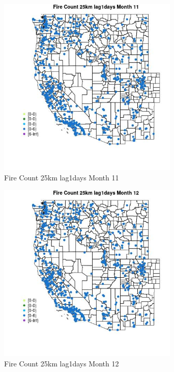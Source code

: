 \begin{figure} 
\centering  
\includegraphics[width=0.77\textwidth]{Code_Outputs/Report_ML_input_PM25_Step4_part_e_de_duplicated_aves_compiled_2019-05-21wNAs_MapObsMo11Fire_Count_25km_lag1days.jpg} 
\caption{\label{fig:Report_ML_input_PM25_Step4_part_e_de_duplicated_aves_compiled_2019-05-21wNAsMapObsMo11Fire_Count_25km_lag1days}Fire Count 25km lag1days Month 11} 
\end{figure} 
 

\begin{figure} 
\centering  
\includegraphics[width=0.77\textwidth]{Code_Outputs/Report_ML_input_PM25_Step4_part_e_de_duplicated_aves_compiled_2019-05-21wNAs_MapObsMo12Fire_Count_25km_lag1days.jpg} 
\caption{\label{fig:Report_ML_input_PM25_Step4_part_e_de_duplicated_aves_compiled_2019-05-21wNAsMapObsMo12Fire_Count_25km_lag1days}Fire Count 25km lag1days Month 12} 
\end{figure} 
 

